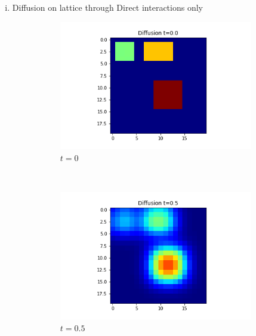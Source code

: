 \documentclass[10pt,a4paper]{article}
\begin{document}
         \begin{enumerate}[i)]
         	\item Diffusion on lattice through Direct interactions only
         	\begin{figure}[!h]
         		\centering
         		\begin{subfigure}[b]{0.25\textwidth}
         			\includegraphics[width=\textwidth]{images/grid-t0-x0.png}
         			\caption{$t=0$}
         			\label{gridt0x0}
         		\end{subfigure}~
         		\begin{subfigure}[b]{0.25\textwidth}
         			\includegraphics[width= \textwidth]{images/grid-t05-x0.png}
         			\caption{$t=0.5$}
         			\label{gridt05x0}
         		\end{subfigure}~
         		\begin{subfigure}[b]{0.25\textwidth}

\end{subfigure}
\end{figure}
\end{enumerate}
\end{document}
